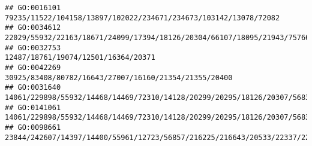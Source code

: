 \documentclass[
]{article}
\begin{document}
\begin{verbatim}
## GO:0016101                                                                                                                                                                                                                                                                                                                                             79235/11522/104158/13897/102022/234671/234673/103142/13078/72082
## GO:0034612                                                                                                                                                                                                                                                                                                  22029/55932/22163/18671/24099/17394/18126/20304/66107/18095/21943/75766/15117/72049/15511/24108/13078/12475
## GO:0032753                                                                                                                                                                                                                                                                                                                                                                          12487/18761/19074/12501/16364/20371
## GO:0042269                                                                                                                                                                                                                                                                                                                                                        30925/83408/80782/16643/27007/16160/21354/21355/20400
## GO:0031640                                                                                                                                                                                                                                                                                                                                     14061/229898/55932/14468/14469/72310/14128/20299/20295/18126/20307/56838
## GO:0141061                                                                                                                                                                                                                                                                                                                                     14061/229898/55932/14468/14469/72310/14128/20299/20295/18126/20307/56838
## GO:0098661                                                                                                                                                                                                                                                                                                                            23844/242607/14397/14400/55961/12723/56857/216225/216643/20533/22337/224796/24115

\end{verbatim}
\end{document}
